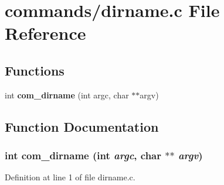 \section{commands/dirname.c File Reference}
\label{dirname_8c}
\subsection*{Functions}
\begin{DoxyCompactItemize}
\item 
int {\bf com\_\-dirname} (int argc, char $\ast$$\ast$argv)
\end{DoxyCompactItemize}


\subsection{Function Documentation}
\subsubsection[{com\_\-dirname}]{\setlength{\rightskip}{0pt plus 5cm}int com\_\-dirname (int {\em argc}, \/  char $\ast$$\ast$ {\em argv})}\label{dirname_8c_ae9803a61089c5028abb6b3fa92685cba}


Definition at line 1 of file dirname.c.

